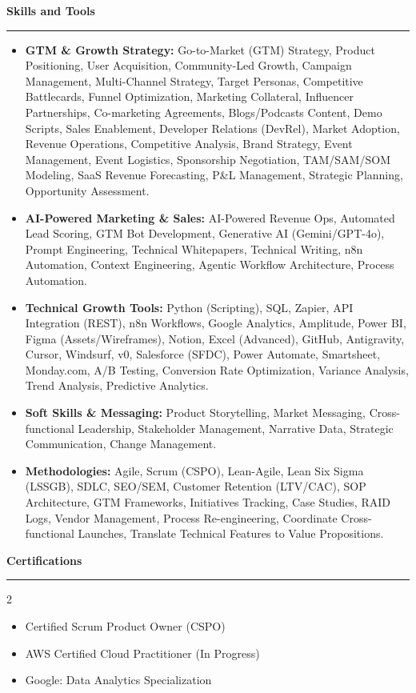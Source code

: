 \documentclass[9pt,letterpaper]{article} %
\newenvironment{rSection}[1]{ %
  \sectionskip
 \textbf{\Large #1} %
  \sectionlineskip
  \hrule %
  \begin{list}{}{ %
    \setlength{\leftmargin}{-0em} %
  }
  \item[]
}{
  \end{list}
}
\def\sectionlineskip{\smallskip} %
\def\sectionskip{} %
\begin{document}
\begin{rSection}{Skills and Tools}
\begin{itemize}[left=-1.5em, labelsep=.1cm, labelwidth=.2cm, itemsep=0.0em, topsep=0pt]
\item \textbf{GTM \& Growth Strategy:} Go-to-Market (GTM) Strategy, Product Positioning, User Acquisition, Community-Led Growth, Campaign Management, Multi-Channel Strategy, Target Personas, Competitive Battlecards, Funnel Optimization, Marketing Collateral, Influencer Partnerships, Co-marketing Agreements, Blogs/Podcasts Content, Demo Scripts, Sales Enablement, Developer Relations (DevRel), Market Adoption, Revenue Operations, Competitive Analysis, Brand Strategy, Event Management, Event Logistics, Sponsorship Negotiation, TAM/SAM/SOM Modeling, SaaS Revenue Forecasting, P\&L Management, Strategic Planning, Opportunity Assessment.
\item \textbf{AI-Powered Marketing \& Sales:} AI-Powered Revenue Ops, Automated Lead Scoring, GTM Bot Development, Generative AI (Gemini/GPT-4o), Prompt Engineering, Technical Whitepapers, Technical Writing, n8n Automation, Context Engineering, Agentic Workflow Architecture, Process Automation.
\item \textbf{Technical Growth Tools:} Python (Scripting), SQL, Zapier, API Integration (REST), n8n Workflows, Google Analytics, Amplitude, Power BI, Figma (Assets/Wireframes), Notion, Excel (Advanced), GitHub, Antigravity, Cursor, Windsurf, v0, Salesforce (SFDC), Power Automate, Smartsheet, Monday.com, A/B Testing, Conversion Rate Optimization, Variance Analysis, Trend Analysis, Predictive Analytics.
\item \textbf{Soft Skills \& Messaging:} Product Storytelling, Market Messaging, Cross-functional Leadership, Stakeholder Management, Narrative Data, Strategic Communication, Change Management.
\item \textbf{Methodologies:} Agile, Scrum (CSPO), Lean-Agile, Lean Six Sigma (LSSGB), SDLC, SEO/SEM, Customer Retention (LTV/CAC), SOP Architecture, GTM Frameworks, Initiatives Tracking, Case Studies, RAID Logs, Vendor Management, Process Re-engineering, Coordinate Cross-functional Launches, Translate Technical Features to Value Propositions.
\end{itemize}
\end{rSection}%
\begin{rSection}{Certifications}
\begin{multicols}{2}
\begin{itemize}[left=-1.5em, labelsep=.1cm, labelwidth=.2cm, itemsep=0.0em, topsep=0pt]
\item Certified Scrum Product Owner (CSPO)
\item AWS Certified Cloud Practitioner (In Progress)
\item Google: Data Analytics Specialization
\end{itemize}
\end{multicols}
\end{rSection}
\end{document}
